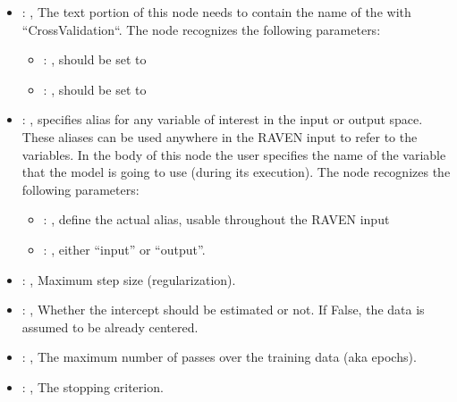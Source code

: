 \begin{itemize}
    \item {}: , 
      The text portion of this node needs to contain the name of the  with
               ``CrossValidation``.
      The  node recognizes the following parameters:
        \begin{itemize}
          \item {}: , 
            should be set to 
          \item {}: , 
            should be set to 
      \end{itemize}

    \item {}: , 
      specifies alias for         any variable of interest in the input or output space. These
      aliases can be used anywhere in the RAVEN input to         refer to the variables. In the body
      of this node the user specifies the name of the variable that the model is going to use
      (during its execution).
      The  node recognizes the following parameters:
        \begin{itemize}
          \item {}: , 
            define the actual alias, usable throughout the RAVEN input
          \item {}: , 
            either ``input'' or ``output''.
      \end{itemize}

    \item {}: , 
      Maximum step size (regularization).

    \item {}: , 
      Whether the intercept should be estimated or not. If False,
      the data is assumed to be already centered.

    \item {}: , 
      The maximum number of passes over the training data (aka epochs).

    \item {}: , 
      The stopping criterion.


\end{itemize}
